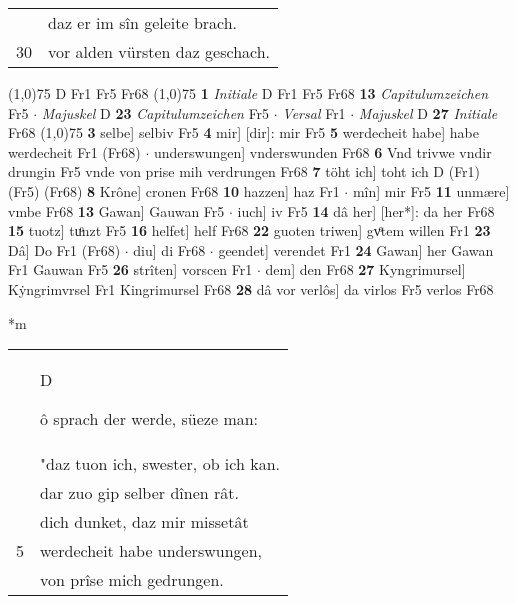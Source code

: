 \documentclass[8pt,a4paper,notitlepage]{article}
\begin{document}
\begin{table}[ht]
\begin{minipage}[t]{0.5\linewidth}
\begin{tabular}{rl}
 & daz er im sîn geleite brach.\\ 
30 & vor alden vürsten daz geschach.\\ 
\end{tabular}
\scriptsize
\line(1,0){75} \newline
D Fr1 Fr5 Fr68 \newline
\line(1,0){75} \newline
\textbf{1} \textit{Initiale} D Fr1 Fr5 Fr68  \textbf{13} \textit{Capitulumzeichen} Fr5   $\cdot$ \textit{Majuskel} D  \textbf{23} \textit{Capitulumzeichen} Fr5   $\cdot$ \textit{Versal} Fr1   $\cdot$ \textit{Majuskel} D  \textbf{27} \textit{Initiale} Fr68  \newline
\line(1,0){75} \newline
\textbf{3} selbe] selbiv Fr5 \textbf{4} mir] [dir]: mir Fr5 \textbf{5} werdecheit habe] habe werdecheit Fr1 (Fr68)  $\cdot$ underswungen] vnderswunden Fr68 \textbf{6} Vnd trivwe vndir drungin Fr5 vnde von prise mih verdrungen Fr68 \textbf{7} töht ich] toht ich D (Fr1) (Fr5) (Fr68) \textbf{8} Krône] cronen Fr68 \textbf{10} hazzen] haz Fr1  $\cdot$ mîn] mir Fr5 \textbf{11} unmære] vmbe Fr68 \textbf{13} Gawan] Gauwan Fr5  $\cdot$ iuch] iv Fr5 \textbf{14} dâ her] [her*]: da her Fr68 \textbf{15} tuotz] tuͦnzt Fr5 \textbf{16} helfet] helf Fr68 \textbf{22} guoten triwen] gvͦtem willen Fr1 \textbf{23} Dâ] Do Fr1 (Fr68)  $\cdot$ diu] di Fr68  $\cdot$ geendet] verendet Fr1 \textbf{24} Gawan] her Gawan Fr1 Gauwan Fr5 \textbf{26} strîten] vorscen Fr1  $\cdot$ dem] den Fr68 \textbf{27} Kyngrimursel] Kẏngrimvrsel Fr1 Kingrimursel Fr68 \textbf{28} dâ vor verlôs] da virlos Fr5 verlos Fr68 \newline
\end{minipage}
\hspace{0.5cm}
\begin{minipage}[t]{0.5\linewidth}
\small
\begin{center}*m
\end{center}
\begin{tabular}{rl}
 & \begin{large}D\end{large}ô sprach der werde, süeze man:\\ 
 & "daz tuon ich, swester, ob ich kan.\\ 
 & dar zuo gip selber dînen rât.\\ 
 & dich dunket, daz mir missetât\\ 
5 & werdecheit habe underswungen,\\ 
 & von prîse mich gedrungen.\\ 

\end{tabular}
\end{minipage}
\end{table}
\end{document}

